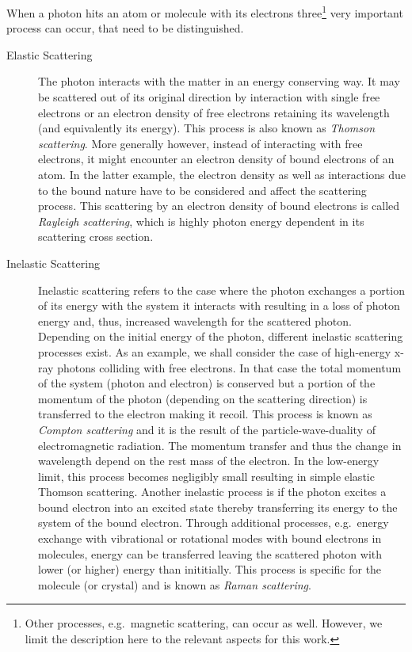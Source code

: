When a photon hits an atom or molecule with its electrons three\footnote{Other processes, e.g.~magnetic scattering, can occur as well. However, we limit the description here to the relevant aspects for this work.} very important process can occur, that need to be distinguished.
\begin{description}
       \item[Elastic Scattering]
          {The photon interacts with the matter in an energy conserving way. It may be scattered out of its original direction by interaction with single free electrons or an electron density of free electrons retaining its wavelength (and equivalently its energy). This process is also known as \emph{Thomson scattering}. More generally however, instead of interacting with free electrons, it might encounter an electron density of bound electrons of an atom. In the latter example, the electron density as well as interactions due to the bound nature have to be considered and affect the scattering process. This scattering by an electron density of bound electrons is called \emph{Rayleigh scattering}, which is highly photon energy dependent in its scattering cross section.}
       \item[Inelastic Scattering]
          {Inelastic scattering refers to the case where the photon exchanges a portion of its energy with the system it interacts with resulting in a loss of photon energy and, thus, increased wavelength for the scattered photon. Depending on the initial energy of the photon, different inelastic scattering processes exist. As an example, we shall consider the case of high-energy x-ray photons colliding with free electrons. In that case the total momentum of the system (photon and electron) is conserved but a portion of the momentum of the photon (depending on the scattering direction) is transferred to the electron making it recoil. This process is known as \emph{Compton scattering} and it is the result of the particle-wave-duality of electromagnetic radiation. The momentum transfer and thus the change in wavelength depend on the rest mass of the electron. In the low-energy limit, this process becomes negligibly small resulting in simple elastic Thomson scattering.      Another inelastic process is if the photon excites a bound electron into an excited state thereby transferring its energy to the system of the bound electron. Through additional processes, e.g.~energy exchange with vibrational or rotational modes with bound electrons in molecules, energy can be transferred leaving the scattered photon with lower (or higher) energy than inititially. This process is specific for the molecule (or crystal) and is known as \emph{Raman scattering}.}

\end{description}

